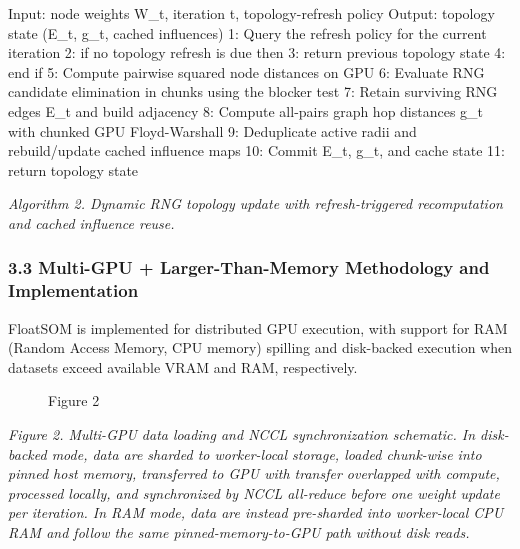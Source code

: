 \documentclass[
]{article}
\newenvironment{Shaded}{}{}
\newcommand{\NormalTok}[1]{#1}
\begin{document}
\begin{Shaded}
\begin{Highlighting}[]
\NormalTok{Input: node weights W\_t, iteration t, topology{-}refresh policy}
\NormalTok{Output: topology state (E\_t, g\_t, cached influences)}
\NormalTok{ 1: Query the refresh policy for the current iteration}
\NormalTok{ 2: if no topology refresh is due then}
\NormalTok{ 3:         return previous topology state}
\NormalTok{ 4: end if}
\NormalTok{ 5: Compute pairwise squared node distances on GPU}
\NormalTok{ 6: Evaluate RNG candidate elimination in chunks using the blocker test}
\NormalTok{ 7: Retain surviving RNG edges E\_t and build adjacency}
\NormalTok{ 8: Compute all{-}pairs graph hop distances g\_t with chunked GPU Floyd{-}Warshall}
\NormalTok{ 9: Deduplicate active radii and rebuild/update cached influence maps}
\NormalTok{10: Commit E\_t, g\_t, and cache state}
\NormalTok{11: return topology state}
\end{Highlighting}
\end{Shaded}

\emph{Algorithm 2. Dynamic RNG topology update with refresh-triggered
recomputation and cached influence reuse.}

\subsubsection{3.3 Multi-GPU + Larger-Than-Memory Methodology and
Implementation}\label{multi-gpu-larger-than-memory-methodology-and-implementation}

FloatSOM is implemented for distributed GPU execution, with support for
RAM (Random Access Memory, CPU memory) spilling and disk-backed
execution when datasets exceed available VRAM and RAM, respectively.

\begin{figure}
\centering

\caption{Figure 2}
\end{figure}

\emph{Figure 2. Multi-GPU data loading and NCCL synchronization
schematic. In disk-backed mode, data are sharded to worker-local
storage, loaded chunk-wise into pinned host memory, transferred to GPU
with transfer overlapped with compute, processed locally, and
synchronized by NCCL all-reduce before one weight update per iteration.
In RAM mode, data are instead pre-sharded into worker-local CPU RAM and
follow the same pinned-memory-to-GPU path without disk reads.}
\end{document}
